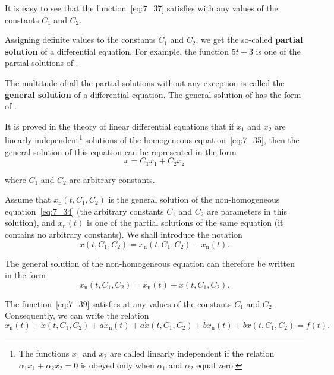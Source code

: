 \noindent
It is easy to see that the function~\eqref{eq:7_37} satisfies  with any values of the constants $C_1$ and $C_2$.

Assigning definite values to the constants $C_1$ and $C_2$, we get the so-called \textbf{partial solution} of a differential equation. For example, the function $5t+3$ is one of the partial solutions of .

The multitude of all the partial solutions without any exception is called the \textbf{general solution} of a differential equation. The general solution of  has the form of .

It is proved in the theory of linear differential equations that if $x_1$ and $x_2$ are linearly independent\footnote{The functions $x_1$ and $x_2$ are called linearly independent if the relation $\alpha_1 x_1+\alpha_2 x_2=0$ is obeyed only when $\alpha_1$ and $\alpha_2$ equal zero.} solutions of the homogeneous equation~\eqref{eq:7_35}, then the general solution of this equation can be represented in the form
\begin{equation}\label{eq:7_38}
	x = C_1 x_1 + C_2 x_2
\end{equation}

\noindent
where $C_1$ and $C_2$ are arbitrary constants.

Assume that $x_{\text{n}}(t, C_1, C_2)$ is the general solution of the non-homogeneous equation~\eqref{eq:7_34} (the arbitrary constants $C_1$ and $C_2$ are parameters in this solution), and $x_{\text{n}}(t)$ is one of the partial solutions of the same equation (it contains no arbitrary constants). We shall introduce the notation
\begin{equation*}
	x(t, C_1, C_2) = x_{\text{n}}(t, C_1, C_2) - x_{\text{n}}(t).
\end{equation*}

\noindent
The general solution of the non-homogeneous equation can therefore be written in the form
\begin{equation}\label{eq:7_39}
	x_{\text{n}}(t, C_1, C_2) = x_{\text{n}}(t) + x(t, C_1, C_2).
\end{equation}

\noindent
The function~\eqref{eq:7_39} satisfies  at any values of the constants $C_1$ and $C_2$. Consequently, we can write the relation
\begin{equation*}
	\ddot{x}_{\text{n}}(t) + \ddot{x}(t, C_1, C_2) + a\dot{x}_{\text{n}}(t) + a\dot{x}(t, C_1, C_2) + bx_{\text{n}}(t) + bx(t, C_1, C_2) = f(t).
\end{equation*}

